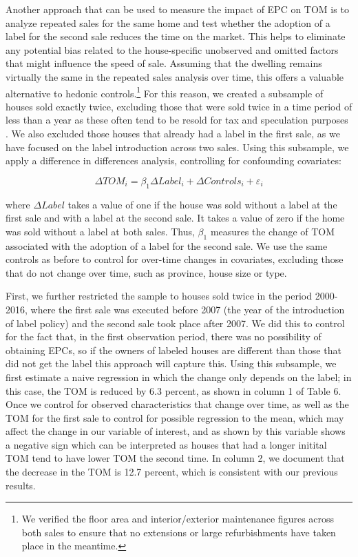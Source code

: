 \documentclass[12pt]{article}
\begin{document}
Another approach that can be used to measure the impact of EPC on TOM is to analyze repeated sales for the same home and test whether the adoption of a label for the second sale reduces the time on the market. This helps to eliminate any potential bias related to the house-specific unobserved and omitted factors that might influence the speed of sale. Assuming that the dwelling remains virtually the same in the repeated sales analysis over time, this offers a valuable alternative to hedonic controls.\footnote{We verified the floor area and interior/exterior maintenance figures across both sales to ensure that no extensions or large refurbishments have taken place in the meantime.} For this reason, we created a subsample of houses sold exactly twice, excluding those that were sold twice in a time period of less than a year as these often tend to be resold for tax and speculation purposes \citep{aydin2017information}. We also excluded those houses that already had a label in the first sale, as we have focused on the label introduction across two sales. Using this subsample, we apply a difference in differences analysis, controlling for confounding covariates:

\begin{equation}
\Delta TOM_i = \beta_1 \Delta Label_i + \Delta Controls_i + \varepsilon_i
\end{equation} 

\noindent where $\Delta Label$ takes a value of one if the house was sold without a label at the first sale and with a label at the second sale. It takes a value of zero if the home was sold without a label at both sales. Thus, $\beta_1 $ measures the change of TOM associated with the adoption of a label for the second sale. We use the same controls as before to control for  over-time changes in covariates, excluding those that do not change over time, such as province, house size or type.  

First, we further restricted the sample to houses sold twice in the period 2000-2016, where the first sale was executed before 2007 (the year of the introduction of label policy) and the second sale took place after 2007. We did this to control for the fact that, in the first observation period, there was no possibility of obtaining EPCs, so if the owners of labeled houses are different than those that did not get the label this approach will capture this. Using this subsample, we first estimate a naive regression in which the change only depends on the label; in this case, the TOM is reduced by 6.3 percent, as shown in column 1 of Table 6. Once we control for observed characteristics that change over time, as well as the TOM for the first sale to control for possible regression to the mean, which may affect the change in our variable of interest, and as shown by \cite{laird1983further} this variable shows a negative sign which can be interpreted as houses that had a longer initital TOM tend to have lower TOM the second time. In column 2, we document that the decrease in the TOM is 12.7 percent, which is consistent with our previous results.
\end{document}

